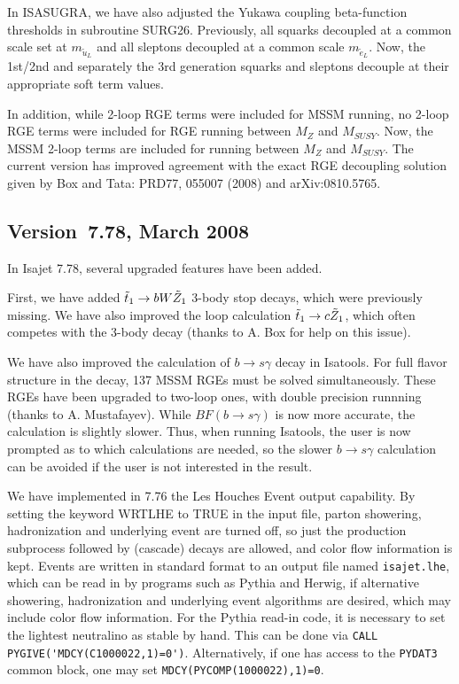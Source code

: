 In ISASUGRA, we have also adjusted the Yukawa coupling beta-function thresholds
in subroutine SURG26. Previously, all squarks decoupled at a common scale
set at $m_{{\tilde u}_L}$ and all sleptons decoupled at a common scale
$m_{{\tilde e}_L}$. Now, the 1st/2nd and separately the 
3rd generation squarks and sleptons
decouple at their appropriate soft term values.

In addition, while 2-loop RGE terms were included for MSSM running,
no 2-loop RGE terms were included for RGE running between 
$M_Z$ and $M_{SUSY}$. Now, the MSSM 2-loop terms are included for
running between $M_Z$ and $M_{SUSY}$. The current version has improved agreement with the exact RGE decoupling solution given by Box and Tata:
PRD77, 055007 (2008) and arXiv:0810.5765.

\subsection{Version~7.78, March 2008}

In Isajet 7.78, several upgraded features have been added.

First, we have added $\tilde{t}_1\rightarrow bW\tilde Z_1$ 3-body stop decays,
which were previously missing. We have also improved the loop calculation 
$\tilde{t}_1\rightarrow c\tilde Z_1$, which often competes with the 3-body decay
(thanks to A. Box for help on this issue).

We have also improved the calculation of $b\rightarrow s\gamma$ decay in Isatools.
For full flavor structure in the decay, 137 MSSM RGEs must be solved simultaneously. 
These RGEs have been upgraded to two-loop ones, with double precision runnning
(thanks to A. Mustafayev).
While $BF(b\rightarrow s\gamma )$ is now more accurate, the calculation is 
slightly slower. Thus, when running Isatools, the user is now prompted 
as to which calculations are needed, so the slower $b\rightarrow s\gamma$ calculation 
can be avoided if the user is not interested in the result.

We have implemented in 7.76 the Les Houches Event output capability. 
By setting  the keyword WRTLHE to TRUE in the input file, parton showering,
hadronization and underlying event are turned off, so just the production
subprocess followed by (cascade) decays are allowed, and color flow information is
kept. Events are written in standard format to an output file named \verb|isajet.lhe|,
which can be read in by programs such as Pythia and Herwig, if alternative 
showering, hadronization and underlying event algorithms are desired, which may include 
color flow information.
For the Pythia read-in code, it is necessary to set the lightest neutralino
as stable by hand. This can be done via \verb|CALL PYGIVE('MDCY(C1000022,1)=0')|. 
Alternatively, if one has access to the \verb|PYDAT3| common block, one may set 
\verb|MDCY(PYCOMP(1000022),1)=0|.

